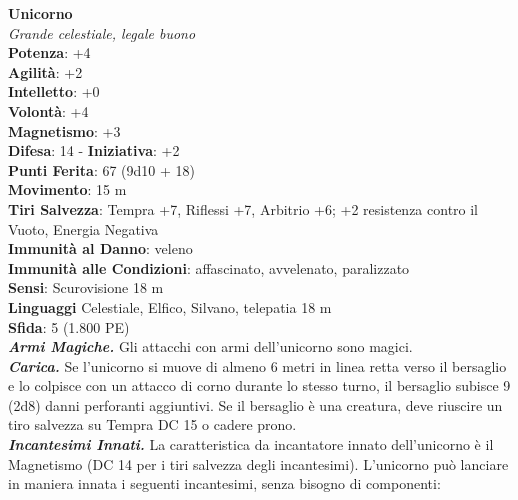 \begin{multicols}{2}
\medskip\textbf{Unicorno}\\
\emph{Grande celestiale, legale buono}\\
\textbf{Potenza}: +4\\
\textbf{Agilità}: +2\\
\textbf{Intelletto}: +0\\
\textbf{Volontà}: +4\\
\textbf{Magnetismo}: +3\\
\textbf{Difesa}: 14 - \textbf{Iniziativa}: +2\\
\textbf{Punti Ferita}: 67 (9d10 + 18)\\
\textbf{Movimento}: 15 m\\
\textbf{Tiri Salvezza}: Tempra +7, Riflessi +7, Arbitrio +6; +2 resistenza contro il Vuoto, Energia Negativa\\
\textbf{Immunità al Danno}: veleno\\
\textbf{Immunità alle Condizioni}: affascinato, avvelenato, paralizzato\\
\textbf{Sensi}: Scurovisione 18 m\\
\textbf{Linguaggi} Celestiale, Elfico, Silvano, telepatia 18 m\\
\textbf{Sfida}: 5 (1.800 PE)\smallskip\\
\emph{\textbf{Armi Magiche.}} Gli attacchi con armi dell'unicorno sono magici.\\
\emph{\textbf{Carica.}} Se l'unicorno si muove di almeno 6 metri in linea retta verso il bersaglio e lo colpisce con un attacco di corno durante lo stesso turno, il bersaglio subisce 9 (2d8) danni perforanti aggiuntivi. Se il bersaglio è una creatura, deve riuscire un tiro salvezza su Tempra DC 15 o cadere prono.\\

\emph{\textbf{Incantesimi Innati.}} La caratteristica da incantatore innato dell'unicorno è il Magnetismo (DC 14 per i tiri salvezza degli incantesimi). L'unicorno può lanciare in maniera innata i seguenti incantesimi, senza bisogno di componenti:\\


\end{multicols}
